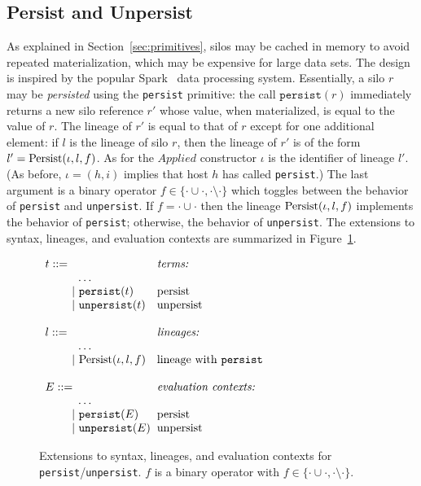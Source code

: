 \subsection{Persist and Unpersist}\label{sec:persist}

As explained in Section~\ref{sec:primitives}, silos may be cached in
memory to avoid repeated materialization, which may be expensive for
large data sets. The design is inspired by the popular
Spark~\cite{Spark} data processing system. Essentially, a silo $r$ may
be {\em persisted} using the \verb|persist| primitive: the call
$\texttt{persist}(r)$ immediately returns a new silo reference $r'$
whose value, when materialized, is equal to the value of $r$.  The
lineage of $r'$ is equal to that of $r$ except for one additional
element: if $l$ is the lineage of silo $r$, then the lineage of $r'$
is of the form $l' = {\textrm{Persist}(\iota, l, f)}$. As for the $\mathit{Applied}$ constructor
$\iota$ is the identifier of lineage $l'$.
(As before, $\iota = (h, i)$ implies that host $h$ has called
\verb|persist|.)  The last argument is a binary operator $f \in \{
\cdot\cup\cdot, \cdot\setminus\cdot \}$ which toggles between the
behavior of \verb|persist| and \verb|unpersist|. If $f =
\cdot\cup\cdot$ then the lineage ${\textrm{Persist}(\iota, l, f)}$ implements the
behavior of \verb|persist|; otherwise, the behavior of
\verb|unpersist|. The extensions to syntax, lineages, and evaluation
contexts are summarized in Figure~\ref{fig:persist-syntax}.

\begin{figure}
\centering
$\ba[t]{l@{\hspace{2mm}}l}
t ::=                                     & \mbox{{\it terms:}} \\
\gap \:\:\:\: \ldots                      & \mbox{} \\
\gap ~|~ \texttt{persist}(t)              & \mbox{persist} \\
\gap ~|~ \texttt{unpersist}(t)            & \mbox{unpersist} \\
& \\
l ::=                                    & \mbox{{\it{lineages:}}} \\
\gap \:\:\:\: \ldots                     & \mbox{} \\
\gap ~|~  \text{Persist}(\iota, l, f)    & \mbox{lineage with \texttt{persist}} \\
& \\
E ::=                             & \mbox{\it{evaluation contexts:}} \\
\gap \:\:\:\: \ldots              & \mbox{} \\
\gap ~|~  \texttt{persist}(E)     & \mbox{persist} \\
\gap ~|~  \texttt{unpersist}(E)   & \mbox{unpersist} \\
\ea$
\caption{Extensions to syntax, lineages, and evaluation contexts for
  \texttt{persist}/\texttt{unpersist}. $f$ is a binary operator with
  $f \in \{\cdot\cup\cdot,
  \cdot\setminus\cdot\}$.}\label{fig:persist-syntax}
\end{figure}

